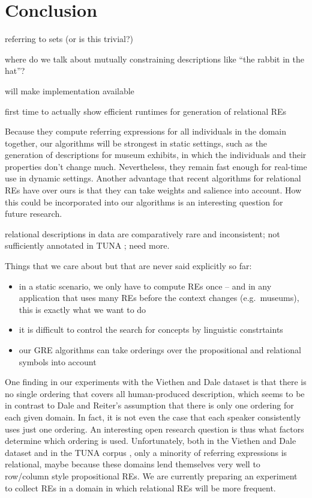 \section{Conclusion} \label{sec:conclusion}

referring to sets (or is this trivial?)

where do we talk about mutually constraining descriptions like ``the
rabbit in the hat''?

will make implementation available

first time to actually show efficient runtimes for generation of
relational REs


Because they compute referring expressions for all individuals in the
domain together, our algorithms will be strongest in static settings,
such as the generation of descriptions for museum exhibits, in which
the individuals and their properties don't change much.  Nevertheless,
they remain fast enough for real-time use in dynamic settings.
Another advantage that recent algorithms for relational REs
\cite{Krahmer2003,kelleher06:_increm_gener_of_spatial_refer} have over
ours is that they can take weights and salience into account.  How
this could be incorporated into our algorithms is an interesting
question for future research.


relational descriptions in data are comparatively rare and
inconsistent; not sufficiently annotated in TUNA
\cite{deemter06:_build_seman_trans_corpus_for}; need more. 


Things that we care about but that are never said explicitly so far:

\begin{itemize}
\item in a static scenario, we only have to compute REs once -- and in
  any application that uses many REs before the context changes (e.g.\
  museums), this is exactly what we want to do
\item it is difficult to control the search for concepts by linguistic
  constrtaints
\item our GRE algorithms can take orderings over the propositional and
  relational symbols into account
\end{itemize}


One finding in our experiments with the Viethen and Dale dataset is
that there is no single ordering that covers all human-produced
description, which seems to be in contrast to Dale and Reiter's
 assumption that there is only one ordering for
each given domain.  In fact, it is not even the case that each speaker
consistently uses just one ordering.  An interesting open research
question is thus what factors determine which ordering is used.
Unfortunately, both in the Viethen and Dale dataset and in the TUNA
corpus \cite{deemter06:_build_seman_trans_corpus_for}, only a minority
of referring expressions is relational, maybe because these domains
lend themselves very well to row/column style propositional REs.  We
are currently preparing an experiment to collect REs in a domain in
which relational REs will be more frequent.


